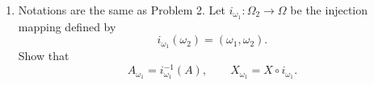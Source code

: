 \documentclass[letterpaper, 12pt]{article}
\begin{document}
\begin{enumerate}
Show that $(I_A)_{\omega_1}=I_{A_{\omega_1}}$ for $A\subset\Omega$ and $(X^{-1}(B))_{\omega_1}=X_{\omega_1}^{-1}(B)$ for $B\subset\Psi$.

\begin{proof}
Let $A \subset \Omega$.
Suppose $\omega_2 \in A_{\omega_1}$. 
Thus $(\omega_1, \omega_2) \in A$. 
Therefore, $I_{A_{\omega_1}}(\omega_2) = 1$ 
and $(I_A)_{\omega_1}(\omega_2) = I_A(\omega_1, \omega_2) = 1$.
Both functions agree for $\omega_2 \in A_{\omega_1}$. 
Now suppose $\omega_2 \notin A_{\omega_1}$. 
Then $(\omega_1, \omega_2) \notin A$. 
Thus $I_{A_{\omega_1}}(\omega_2) = 0$ 
and $(I_{A})_{\omega_1} (\omega_2) = I_A (\omega_1, \omega_2) = 0$. 
And we conclude $(I_A)_{\omega_1}=I_{A_{\omega_1}}$ for $A\subset\Omega$.

For the second part, note for all $B \subset \Psi$
\begin{align*}
(X^{-1}(B))_{\omega_1} 
&= \{\omega_2 \in \Omega_2 : (\omega_1, \omega_2) \in X^{-1}(B)\} \\
&= \{\omega_2 \in \Omega_2 : X(\omega_1, \omega_2) \in B\} \\
&= \{\omega_2 \in \Omega_2 : X_{\omega_1}(\omega_2) \in B\} \\
&= (X_{\omega_1})^{-1}(B) \\
&= X_{\omega_1}^{-1}(B)
\end{align*}
as desired.
\end{proof}
\item
Notations are the same as Problem 2. 
Let $i_{\omega_1}:\Omega_2\to\Omega$ be the injection mapping defined by
\[
i_{\omega_1}(\omega_2) = (\omega_1,\omega_2).
\]
Show that
\[
A_{\omega_1} = i_{\omega_1}^{-1}(A),
\qquad 
X_{\omega_1} = X \circ i_{\omega_1}.
\]


\end{enumerate}
\end{document}
